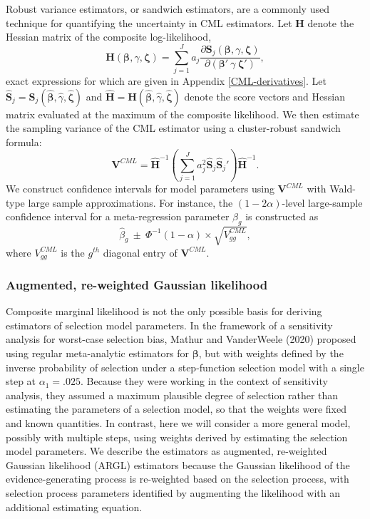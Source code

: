 \documentclass[
  man, donotrepeattitle,floatsintext]{apa7}
\begin{document}
Robust variance estimators, or sandwich estimators, are a commonly used technique for quantifying the uncertainty in CML estimators. Let \(\mathbf{H}\) denote the Hessian matrix of the composite log-likelihood,
\begin{equation}
\mathbf{H}(\boldsymbol\beta, \gamma, \boldsymbol\zeta) = \sum_{j=1}^J a_j \frac{\partial \mathbf{S}_j(\boldsymbol\beta, \gamma, \boldsymbol\zeta)}{\partial \left(\boldsymbol\beta' \ \gamma \ \boldsymbol\zeta'\right)},
\end{equation}
exact expressions for which are given in Appendix \ref{CML-derivatives}.
Let \(\mathbf{\hat{S}}_j = \mathbf{S}_j(\boldsymbol{\hat\beta}, \hat\gamma, \boldsymbol{\hat\zeta})\) and \(\mathbf{\hat{H}} = \mathbf{H}(\boldsymbol{\hat\beta}, \hat\gamma, \boldsymbol{\hat\zeta})\) denote the score vectors and Hessian matrix evaluated at the maximum of the composite likelihood.
We then estimate the sampling variance of the CML estimator using a cluster-robust sandwich formula:
\begin{equation}
\label{eq:sandwich-variance}
\mathbf{V}^{CML} = \mathbf{\hat{H}}^{-1}\left(\sum_{j=1}^J a_j^2 \mathbf{\hat{S}}_j {\mathbf{\hat{S}}_j}'\right) \mathbf{\hat{H}}^{-1}.
\end{equation}
We construct confidence intervals for model parameters using \(\mathbf{V}^{CML}\) with Wald-type large sample approximations. For instance, the \((1 - 2\alpha)\)-level large-sample confidence interval for a meta-regression parameter \(\beta_g\) is constructed as
\[
\hat\beta_g \ \pm \ \Phi^{-1}(1 - \alpha) \times \sqrt{V^{CML}_{gg}},
\]
where \(V^{CML}_{gg}\) is the \(g^{th}\) diagonal entry of \(\mathbf{V}^{CML}\).

\subsubsection{Augmented, re-weighted Gaussian likelihood}\label{augmented-re-weighted-gaussian-likelihood}

Composite marginal likelihood is not the only possible basis for deriving estimators of selection model parameters.
In the framework of a sensitivity analysis for worst-case selection bias, Mathur and VanderWeele (2020) proposed using regular meta-analytic estimators for \(\boldsymbol\beta\), but with weights defined by the inverse probability of selection under a step-function selection model with a single step at \(\alpha_1 = .025\).
Because they were working in the context of sensitivity analysis, they assumed a maximum plausible degree of selection rather than estimating the parameters of a selection model, so that the weights were fixed and known quantities.
In contrast, here we will consider a more general model, possibly with multiple steps, using weights derived by estimating the selection model parameters.
We describe the estimators as augmented, re-weighted Gaussian likelihood (ARGL) estimators because the Gaussian likelihood of the evidence-generating process is re-weighted based on the selection process, with selection process parameters identified by augmenting the likelihood with an additional estimating equation.
\end{document}
